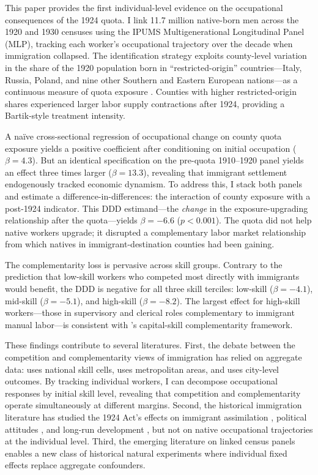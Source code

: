 \documentclass[12pt]{article}
\begin{document}
This paper provides the first individual-level evidence on the occupational consequences of the 1924 quota. I link 11.7 million native-born men across the 1920 and 1930 censuses using the IPUMS Multigenerational Longitudinal Panel (MLP), tracking each worker's occupational trajectory over the decade when immigration collapsed. The identification strategy exploits county-level variation in the share of the 1920 population born in ``restricted-origin'' countries---Italy, Russia, Poland, and nine other Southern and Eastern European nations---as a continuous measure of quota exposure \citep{tabellini2020, goldsmith2022}. Counties with higher restricted-origin shares experienced larger labor supply contractions after 1924, providing a Bartik-style treatment intensity.

A na\"ive cross-sectional regression of occupational change on county quota exposure yields a positive coefficient after conditioning on initial occupation ($\beta = 4.3$). But an identical specification on the pre-quota 1910--1920 panel yields an effect three times larger ($\beta = 13.3$), revealing that immigrant settlement endogenously tracked economic dynamism. To address this, I stack both panels and estimate a difference-in-differences: the interaction of county exposure with a post-1924 indicator. This DDD estimand---the \emph{change} in the exposure-upgrading relationship after the quota---yields $\beta = -6.6$ ($p < 0.001$). The quota did not help native workers upgrade; it disrupted a complementary labor market relationship from which natives in immigrant-destination counties had been gaining.

The complementarity loss is pervasive across skill groups. Contrary to the prediction that low-skill workers who competed most directly with immigrants would benefit, the DDD is negative for all three skill terciles: low-skill ($\beta = -4.1$), mid-skill ($\beta = -5.1$), and high-skill ($\beta = -8.2$). The largest effect for high-skill workers---those in supervisory and clerical roles complementary to immigrant manual labor---is consistent with \citet{lewis2011}'s capital-skill complementarity framework.

These findings contribute to several literatures. First, the debate between the competition and complementarity views of immigration has relied on aggregate data: \citet{borjas2003} uses national skill cells, \citet{card2001} uses metropolitan areas, and \citet{tabellini2020} uses city-level outcomes. By tracking individual workers, I can decompose occupational responses by initial skill level, revealing that competition and complementarity operate simultaneously at different margins. Second, the historical immigration literature has studied the 1924 Act's effects on immigrant assimilation \citep{abramitzky2014, abramitzky2012}, political attitudes \citep{tabellini2020}, and long-run development \citep{sequeira2020}, but not on native occupational trajectories at the individual level. Third, the emerging literature on linked census panels \citep{abramitzkyboustan2017, abramitzky2021, price2020} enables a new class of historical natural experiments where individual fixed effects replace aggregate confounders.
\end{document}
